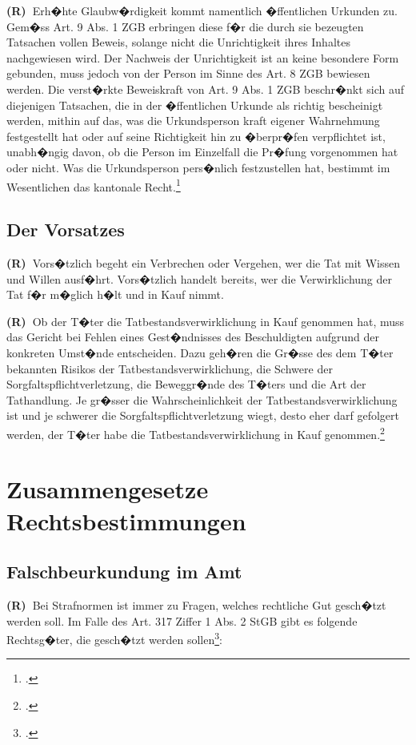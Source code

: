 \documentclass[paper=a4,fontsize=12pt, oneside, numbers=noenddot]{scrbook}
\newcounter{rz}
\newcommand{\Rz}{\addtocounter{rz}{1}\textbf{(R\arabic{rz})~}}
\begin{document}
	\Rz Erh�hte Glaubw�rdigkeit kommt namentlich �ffentlichen Urkunden zu. Gem�ss Art. 9 Abs. 1 ZGB erbringen diese f�r die durch sie bezeugten Tatsachen vollen Beweis, solange nicht die Unrichtigkeit ihres Inhaltes nachgewiesen wird. Der Nachweis der Unrichtigkeit ist an keine besondere Form gebunden, muss jedoch von der Person im Sinne des Art. 8 ZGB bewiesen werden. Die verst�rkte Beweiskraft von Art. 9 Abs. 1 ZGB beschr�nkt sich auf diejenigen Tatsachen, die in der �ffentlichen Urkunde als richtig bescheinigt werden, mithin auf das, was die Urkundsperson kraft eigener Wahrnehmung festgestellt hat oder auf seine Richtigkeit hin zu �berpr�fen verpflichtet ist, unabh�ngig davon, ob die Person im Einzelfall die Pr�fung vorgenommen hat oder nicht. Was die Urkundsperson pers�nlich festzustellen hat, bestimmt im Wesentlichen das kantonale Recht.\footcite{BGE113IV77}
	
	
	\subsection{Der Vorsatzes}
	\Rz Vors�tzlich begeht ein Verbrechen oder Vergehen, wer die Tat mit Wissen und Willen ausf�hrt. Vors�tzlich handelt bereits, wer die Verwirklichung der Tat f�r m�glich h�lt und in Kauf nimmt.
	
	\Rz Ob der T�ter die Tatbestandsverwirklichung in Kauf genommen hat, muss das Gericht bei Fehlen eines Gest�ndnisses des Beschuldigten aufgrund der konkreten Umst�nde entscheiden. Dazu geh�ren die Gr�sse des dem T�ter bekannten Risikos der Tatbestandsverwirklichung, die Schwere der Sorgfaltspflichtverletzung, die Beweggr�nde des T�ters und die Art der Tathandlung. Je gr�sser die Wahrscheinlichkeit der Tatbestandsverwirklichung ist und je schwerer die Sorgfaltspflichtverletzung wiegt, desto eher darf gefolgert werden, der T�ter habe die Tatbestandsverwirklichung in Kauf genommen.\footcite[Erw. 2.2.1.1 d) - (Seite 67)]{KGE46018365}
	
	\section{Zusammengesetze Rechtsbestimmungen}
	
	\subsection{Falschbeurkundung im Amt}
	\Rz Bei Strafnormen ist immer zu Fragen, welches rechtliche Gut gesch�tzt werden soll. Im Falle des Art. 317 Ziffer 1 Abs. 2 StGB gibt es folgende Rechtsg�ter, die gesch�tzt werden sollen\footcite[Art. 317, Rz. 1]{2020:Wohlers:StGBHandkommentar}:
	
\end{document}
